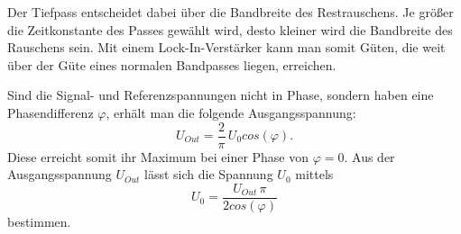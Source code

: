 \noindent Der Tiefpass entscheidet dabei über die Bandbreite des Restrauschens. 
Je größer die Zeitkonstante des Passes gewählt wird, desto kleiner wird die Bandbreite 
des Rauschens sein. Mit einem Lock-In-Verstärker kann man somit Güten, 
die weit über der Güte eines normalen Bandpasses liegen, erreichen.

\noindent Sind die Signal- und Referenzspannungen nicht in Phase, sondern haben eine 
Phasendifferenz $\varphi$, erhält man die folgende Ausgangsspannung: 
\begin{equation}
    U_{Out} = \frac{2}{\pi}\, U_{0} cos(\varphi).
    \label{eqn:u_out}
\end{equation}
Diese erreicht somit ihr Maximum bei einer Phase von $\varphi = 0$.
Aus der Ausgangsspannung $U_{Out}$ lässt sich die Spannung $U_{0}$ mittels
\begin{equation}
    U_{0} = \frac{U_{Out}\, \pi}{2 cos(\varphi)} %
    \label{eqn:u_0}
\end{equation}
bestimmen.
